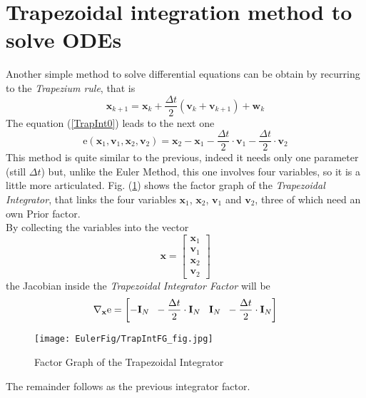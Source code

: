 \documentclass[12pt,a4paper]{book}
\begin{document}
\section*{Trapezoidal integration method to solve ODEs}
Another simple method to solve differential equations can be obtain by recurring to the \textit{Trapezium rule}, that is
\begin{equation}
\mathbf{x}_{k+1}=\mathbf{x}_k+\frac{\Delta t}{2}\left( \mathbf{v}_k+\mathbf{v}_{k+1}\right) +\mathbf{w}_k
\label{TrapInt0}
\end{equation}
The equation (\ref{TrapInt0}) leads to the next one
\begin{equation}
\text{e}\left(\mathbf{x}_1,\mathbf{v}_1,\mathbf{x}_2,\mathbf{v}_2\right)= \mathbf{x}_2 - \mathbf{x}_1 - \frac{\Delta t}{2} \cdot \mathbf{v}_1 - \frac{\Delta t}{2} \cdot \mathbf{v}_2
\label{TrapInt1}
\end{equation}
This method is quite similar to the previous, indeed it needs only one parameter (still $\Delta t$) but, unlike the Euler Method, this one involves four variables, so it is a little more articulated. Fig. (\ref{TrapIntFG}) shows the factor graph of the \textit{Trapezoidal Integrator}, that links the four variables $\mathbf{x}_1$, $\mathbf{x}_2$, $\mathbf{v}_1$ and $\mathbf{v}_2$, three of which need an own Prior factor.
\\By collecting the variables into the vector 
\begin{equation*}
\mathbf{x}=
\begin{bmatrix}
\mathbf{x}_1 \\ \mathbf{v}_1 \\ \mathbf{x}_2 \\ \mathbf{v}_2
\end{bmatrix}
\end{equation*}
the Jacobian inside the \textit{Trapezoidal Integrator Factor} will be
\begin{equation}
\nabla_\mathbf{x}\text{e}= 
\left[-\mathbf{I}_N \hspace*{0.2cm} -\frac{\Delta t}{2} \cdot \mathbf{I}_N \hspace*{0.3cm} \mathbf{I}_N \hspace*{0.2cm} -\frac{\Delta t}{2} \cdot \mathbf{I}_N\right]
\end{equation}

\begin{figure}[hbtp]
\centering
\texttt{[image: EulerFig/TrapIntFG\_fig.jpg]}
\caption{Factor Graph of the Trapezoidal Integrator}
\label{TrapIntFG}
\end{figure}
The remainder follows as the previous integrator factor.
\end{document}
